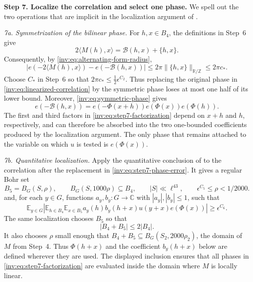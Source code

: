 \documentclass[twoside]{aomart}
\makeatletter
\theoremstyle{paperplain}
\theoremstyle{paperdefinition}
\renewenvironment{proof}[1][\proofname]{\par\pushQED{\qed}%
  \normalfont\topsep6\p@\@plus3\p@\relax\trivlist
  \item[\hskip\labelsep\itshape #1\@addpunct{.}]\ignorespaces
}{\popQED\endtrivlist\@endpefalse}
\numberwithin{equation}{section}
\makeatother
\begin{document}
\begin{proof}
\par
\medskip
\noindent\textbf{Step 7. Localize the correlation and select one phase.}
We spell out the two operations that are implicit in the localization
argument of \cite[Appendix~A.4]{LengQuadratic}.

\smallskip
\noindent\emph{7a. Symmetrization of the bilinear phase.}
For $h,x\in B_4$, the definitions in Step~6 give
\[
 2\langle M(h),x\rangle
   =\mathcal B(h,x)+\{h,x\}.
\]
Consequently, by \eqref{inv:eq:alternating-form-radius},
\begin{equation}
 \left|e\!\left(-2\langle M(h),x\rangle\right)
       -e\!\left(-\mathcal B(h,x)\right)\right|
 \le 2\pi\|\{h,x\}\|_{\mathbb R/\mathbb Z}
 \le 2\pi c_*.
 \label{inv:eq:step7-phase-error}
\end{equation}
Choose $C_*$ in Step~6 so that
$2\pi c_*\le\tfrac12\epsilon^{C_2}$. Thus replacing the original
phase in \eqref{inv:eq:linearized-correlation} by the symmetric phase
loses at most one half of its lower bound. Moreover,
\eqref{inv:eq:symmetric-phase} gives
\begin{equation}
 e\!\left(-\mathcal B(h,x)\right)
 =e\!\left(-\Phi(x+h)\right)e\!\left(\Phi(x)\right)
  e\!\left(\Phi(h)\right).
 \label{inv:eq:step7-factorization}
\end{equation}
The first and third factors in \eqref{inv:eq:step7-factorization}
depend on $x+h$ and $h$, respectively, and can therefore be absorbed
into the two one-bounded coefficients produced by the localization
argument. The only phase that remains attached to the variable on
which $u$ is tested is $e(\Phi(x))$.

\smallskip
\noindent\emph{7b. Quantitative localization.}
Apply the quantitative conclusion of
\cite[Appendix~A.4]{LengQuadratic} to the correlation after the
replacement in \eqref{inv:eq:step7-phase-error}. It gives a regular Bohr
set
\[
 B_5=B_G(S,\rho),\qquad
 B_G(S,1000\rho)\subseteq B_4,\qquad
 |S|\ll\ell^{43},\qquad \epsilon^{C_5}\le\rho<1/2000.
\]
and, for each $y\in G$, functions $a_y,b_y:G\to\mathbb C$ with
$|a_y|,|b_y|\le1$, such that
\begin{equation}
 \mathbb E_{y\in G}\left|
 \mathbb E_{h\in B_4}\mathbb E_{x\in B_5}
 a_y(h)b_y(h+x)u(y+x)e\!\left(\Phi(x)\right)
 \right|
 \ge\epsilon^{C_6}.
 \label{inv:eq:localized-bilinear-correlation}
\end{equation}
The same localization chooses $B_5$ so that
\begin{equation}
 |B_4+B_5|\le2|B_4|.
 \label{inv:eq:step7-doubling}
\end{equation}
It also chooses $\rho$ small enough that
$B_4+B_5\subseteq B_G(S_2,2000\rho_2)$, the domain of $M$ from
Step~4. Thus $\Phi(h+x)$ and the coefficient $b_y(h+x)$ below are
defined wherever they are used. The displayed inclusion ensures that all phases
in \eqref{inv:eq:step7-factorization} are evaluated inside the domain
where $M$ is locally linear.


\end{proof}
\end{document}
